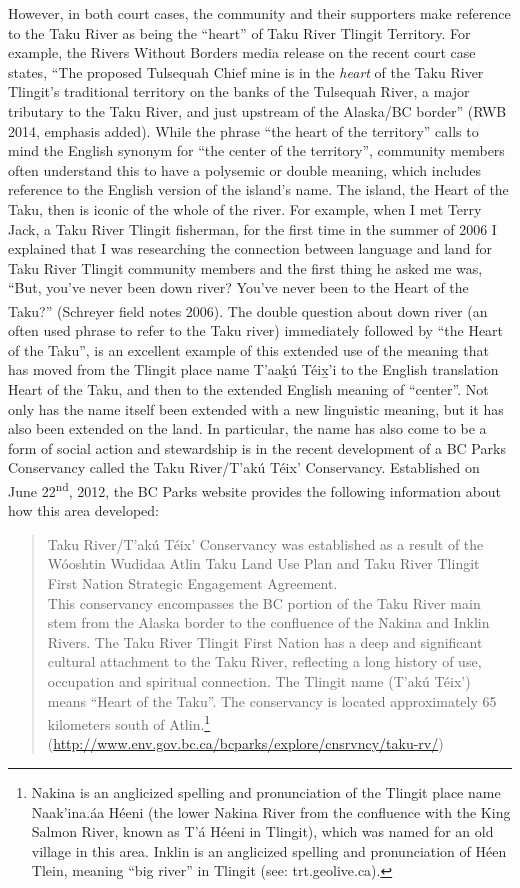 However, in both court cases, the community and their supporters make reference to the Taku River as being the “heart” of Taku River Tlingit Territory. For example, the Rivers Without Borders media release on the recent court case states, “The proposed Tulsequah Chief mine is in the \textit{heart} of the Taku River Tlingit’s traditional territory on the banks of the Tulsequah River, a major tributary to the Taku River, and just upstream of the Alaska/BC border” (RWB 2014, emphasis added). While the phrase “the heart of the territory” calls to mind the English synonym for “the center of the territory”, community members often understand this to have a polysemic or double meaning, which includes reference to the English version of the island’s name. The island, the Heart of the Taku, then is iconic of the whole of the river. For example, when I met Terry Jack, a Taku River Tlingit fisherman, for the first time in the summer of 2006 I explained that I was researching the connection between language and land for Taku River Tlingit community members and the first thing he asked me was, “But, you’ve never been down river? You’ve never been to the Heart of the Taku?”\textsuperscript{ }(Schreyer field notes 2006). The double question about down river (an often used phrase to refer to the Taku river) immediately followed by “the Heart of the Taku”, is an excellent example of this extended use of the meaning that has moved from the Tlingit place name T'aak̲ú Téix̲'i to the English translation Heart of the Taku, and then to the extended English meaning of “center”. Not only has the name itself been extended with a new linguistic meaning, but it has also been extended on the land. In particular, the name has also come to be a form of social action and stewardship is in the recent development of a BC Parks Conservancy called the Taku River/T’akú Téix’ Conservancy. Established on June 22\textsuperscript{nd}, 2012, the BC Parks website provides the following information about how this area developed:

\begin{quote}
Taku River/T’akú Téix’ Conservancy was established as a result of the Wóoshtin Wudidaa Atlin Taku Land Use Plan and Taku River Tlingit First Nation Strategic Engagement Agreement. \\

This conservancy encompasses the BC portion of the Taku River main stem from the Alaska border to the confluence of the Nakina and Inklin Rivers. The Taku River Tlingit First Nation has a deep and significant cultural attachment to the Taku River, reflecting a long history of use, occupation and spiritual connection. The Tlingit name (T’akú Téix’) means “Heart of the Taku”. The conservancy is located approximately 65 kilometers south of Atlin.\footnote{ Nakina is an anglicized spelling and pronunciation of the Tlingit place name Naak’ina.áa Héeni (the lower Nakina River from the confluence with the King Salmon River, known as T’á Héeni in Tlingit), which was named for an old village in this area. Inklin is an anglicized spelling and pronunciation of Héen Tlein, meaning “big river” in Tlingit (see: trt.geolive.ca). } (\url{http://www.env.gov.bc.ca/bcparks/explore/cnsrvncy/taku-rv/})
\end{quote}

